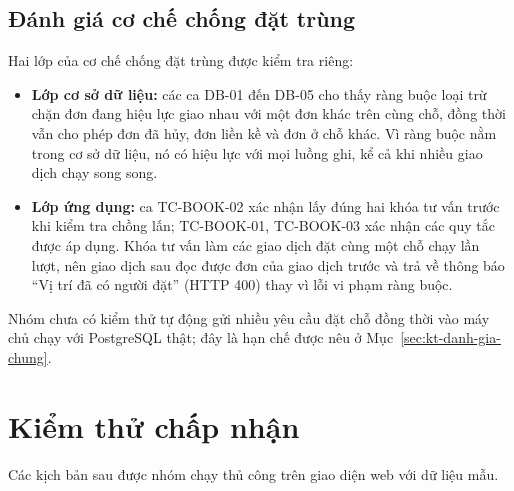 \subsection{Đánh giá cơ chế chống đặt trùng}
Hai lớp của cơ chế chống đặt trùng được kiểm tra riêng:
\begin{itemize}
    \item \textbf{Lớp cơ sở dữ liệu:} các ca DB-01 đến DB-05 cho thấy ràng buộc loại trừ chặn đơn đang hiệu lực giao nhau với một đơn khác trên cùng chỗ, đồng thời vẫn cho phép đơn đã hủy, đơn liền kề và đơn ở chỗ khác. Vì ràng buộc nằm trong cơ sở dữ liệu, nó có hiệu lực với mọi luồng ghi, kể cả khi nhiều giao dịch chạy song song.
    \item \textbf{Lớp ứng dụng:} ca TC-BOOK-02 xác nhận  lấy đúng hai khóa tư vấn trước khi kiểm tra chồng lấn; TC-BOOK-01, TC-BOOK-03 xác nhận các quy tắc được áp dụng. Khóa tư vấn làm các giao dịch đặt cùng một chỗ chạy lần lượt, nên giao dịch sau đọc được đơn của giao dịch trước và trả về thông báo ``Vị trí đã có người đặt'' (HTTP 400) thay vì lỗi vi phạm ràng buộc.
\end{itemize}
Nhóm chưa có kiểm thử tự động gửi nhiều yêu cầu đặt chỗ đồng thời vào máy chủ chạy với PostgreSQL thật; đây là hạn chế được nêu ở Mục~\ref{sec:kt-danh-gia-chung}.

\section{Kiểm thử chấp nhận}
\label{sec:kt-e2e}

Các kịch bản sau được nhóm chạy thủ công trên giao diện web với dữ liệu mẫu.

